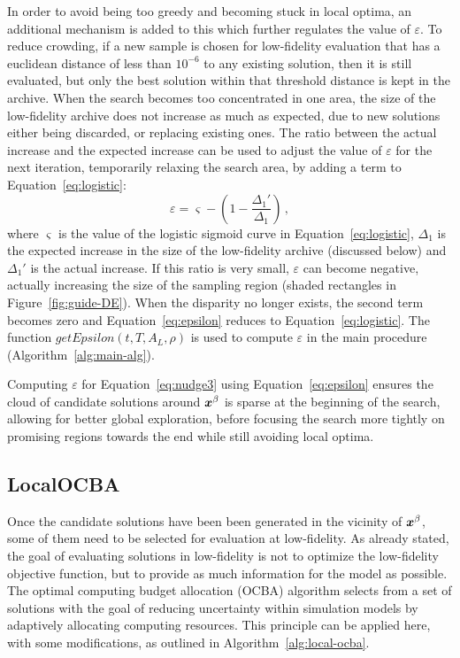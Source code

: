 In order to avoid being too greedy and becoming stuck in local optima, an additional mechanism is added to this which further regulates the value of $\varepsilon$. To reduce crowding, if a new sample is chosen for low-fidelity evaluation that has a euclidean distance of less than $10^{-6}$ to any existing solution, then it is still evaluated, but only the best solution within that threshold distance is kept in the archive. When the search becomes too concentrated in one area, the size of the low-fidelity archive does not increase as much as expected, due to new solutions either being discarded, or replacing existing ones. The ratio between the actual increase and the expected increase can be used to adjust the value of $\varepsilon$ for the next iteration, temporarily relaxing the search area, by adding a term to Equation~\ref{eq:logistic}:
\begin{equation}\label{eq:epsilon}
\varepsilon = \varsigma - \left(1 - \dfrac{\Delta_1'}{\Delta_1}\right)\,,
\end{equation}
where $\varsigma$ is the value of the logistic sigmoid curve in Equation~\ref{eq:logistic}, $\Delta_1$ is the expected increase in the size of the low-fidelity archive (discussed below) and $\Delta_1'$ is the actual increase. If this ratio is very small, $\varepsilon$ can become negative, actually increasing the size of the sampling region (shaded rectangles in Figure~\ref{fig:guide-DE}). When the disparity no longer exists, the second term becomes zero and Equation~\ref{eq:epsilon} reduces to Equation~\ref{eq:logistic}. The function $getEpsilon(t,T,A_L,\rho)$ is used to compute $\varepsilon$ in the main \AlgName{} procedure (Algorithm~\ref{alg:main-alg}).

Computing $\varepsilon$ for Equation~\ref{eq:nudge3} using Equation~\ref{eq:epsilon} ensures the cloud of candidate solutions around $\boldsymbol{x}^\beta$ is sparse at the beginning of the search, allowing for better global exploration, before focusing the search more tightly on promising regions towards the end while still avoiding local optima.

\subsection{LocalOCBA}\label{subsec:local}
Once the candidate solutions have been been generated in the vicinity of $\boldsymbol{x}^\beta$, some of them need to be selected for evaluation at low-fidelity. As already stated, the goal of evaluating solutions in low-fidelity is not to optimize the low-fidelity objective function, but to provide as much information for the model as possible. The optimal computing budget allocation (OCBA) algorithm selects from a set of solutions with the goal of reducing uncertainty within simulation models by adaptively allocating computing resources. This principle can be applied here, with some modifications, as outlined in Algorithm~\ref{alg:local-ocba}.

